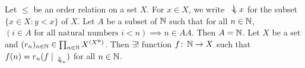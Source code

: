  Let $\leq$ be an order relation on a set $X$. For $x \in X$, we write $\ddownarrow x$ for the subset $\{ x \in X \colon y < x \}$ of $X$.
 Let $A$ be a subset of $\operatorname{\mathbb{N}}$ such that for all $n \in \operatorname{\mathbb{N}}$, $(i \in A \text{ for all natural numbers } i < n) \implies n \in AA$. Then $A = \operatorname{\mathbb{N}}$.
 Let $X$ be a set and $(r_n)_{n \in \operatorname{\mathbb{N}}} \in \prod_{n \in \operatorname{\mathbb{N}}} X^{(X^{\mathbf{n}})}$. Then $\exists!$ function $f \colon \operatorname{\mathbb{N}} \to X$ such that $f(n) = r_n (f \mid_{\ddownarrow_n})$ for all $n \in \operatorname{\mathbb{N}}$.
